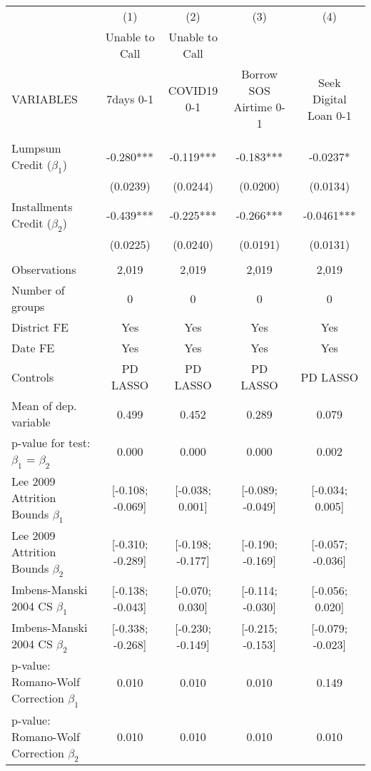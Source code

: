\begin{tabular}{lcccc} \hline
 & (1) & (2) & (3) & (4) \\
 & Unable to Call & Unable to Call &  &  \\
VARIABLES & 7days 0-1 & COVID19 0-1 & Borrow SOS Airtime 0-1 & Seek Digital Loan 0-1 \\ \hline
 &  &  &  &  \\
Lumpsum Credit ($\beta_1$) & -0.280*** & -0.119*** & -0.183*** & -0.0237* \\
 & (0.0239) & (0.0244) & (0.0200) & (0.0134) \\
Installments Credit ($\beta_2$) & -0.439*** & -0.225*** & -0.266*** & -0.0461*** \\
 & (0.0225) & (0.0240) & (0.0191) & (0.0131) \\
 &  &  &  &  \\
Observations & 2,019 & 2,019 & 2,019 & 2,019 \\
Number of groups & 0 & 0 & 0 & 0 \\
District FE & Yes & Yes & Yes & Yes \\
Date FE & Yes & Yes & Yes & Yes \\
Controls & PD LASSO & PD LASSO & PD LASSO & PD LASSO \\
Mean of dep. variable & 0.499 & 0.452 & 0.289 & 0.079 \\
p-value for test: $\beta_1$ = $\beta_2$ & 0.000 & 0.000 & 0.000 & 0.002 \\
Lee 2009 Attrition Bounds $\beta_1$ & [-0.108; -0.069] & [-0.038; 0.001] & [-0.089; -0.049] & [-0.034; 0.005] \\
Lee 2009 Attrition Bounds $\beta_2$ & [-0.310; -0.289] & [-0.198; -0.177] & [-0.190; -0.169] & [-0.057; -0.036] \\
Imbens-Manski 2004 CS $\beta_1$ & [-0.138; -0.043] & [-0.070; 0.030] & [-0.114; -0.030] & [-0.056; 0.020] \\
Imbens-Manski 2004 CS $\beta_2$ & [-0.338; -0.268] & [-0.230; -0.149] & [-0.215; -0.153] & [-0.079; -0.023] \\
p-value: Romano-Wolf Correction $\beta_1$ & 0.010 & 0.010 & 0.010 & 0.149 \\
 p-value: Romano-Wolf Correction $\beta_2$ & 0.010 & 0.010 & 0.010 & 0.010 \\ \hline
\end{tabular}
